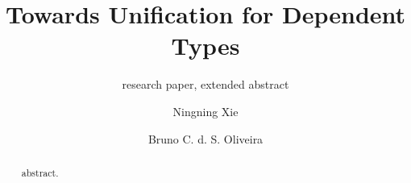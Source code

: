 \documentclass[oribibl, citeauthoryear]{llncs}
\author{Ningning Xie \and Bruno C. d. S. Oliveira}
\institute{The University of Hong Kong}
\begin{document}
\setlength{\pdfpageheight}{\paperheight}
\setlength{\pdfpagewidth}{\paperwidth}


\title{Towards Unification for Dependent Types}
\subtitle{research paper, extended abstract}
\maketitle

\begin{abstract}
  abstract.
\end{abstract}











\newpage
\appendix



\end{document}
